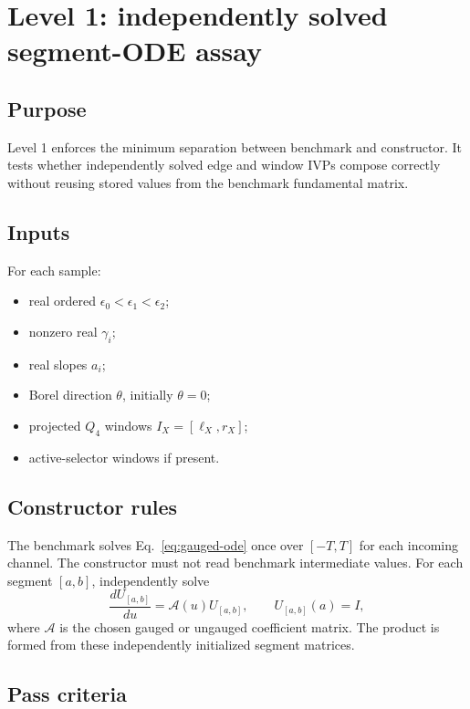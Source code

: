 \documentclass[11pt]{article}
\newcommand{\calA}{\mathcal A}
\begin{document}
\section{Level 1: independently solved segment-ODE assay}

\subsection{Purpose}

Level 1 enforces the minimum separation between benchmark and constructor. It tests whether independently solved edge and window IVPs compose correctly without reusing stored values from the benchmark fundamental matrix.

\subsection{Inputs}

For each sample:
\begin{itemize}
  \item real ordered $\epsilon_0<\epsilon_1<\epsilon_2$;
  \item nonzero real $\gamma_i$;
  \item real slopes $a_i$;
  \item Borel direction $\theta$, initially $\theta=0$;
  \item projected $Q_4$ windows $I_X=[\ell_X,r_X]$;
  \item active-selector windows if present.
\end{itemize}

\subsection{Constructor rules}

The benchmark solves Eq.~\eqref{eq:gauged-ode} once over $[-T,T]$ for each incoming channel. The constructor must not read benchmark intermediate values. For each segment $[a,b]$, independently solve
\begin{equation}
\frac{dU_{[a,b]}}{du}=\calA(u)U_{[a,b]},\qquad U_{[a,b]}(a)=I,
\end{equation}
where $\calA$ is the chosen gauged or ungauged coefficient matrix. The product is formed from these independently initialized segment matrices.

\subsection{Pass criteria}
\end{document}
